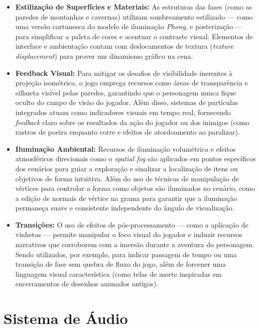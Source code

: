 \begin{itemize}
	\item \textbf{Estilização de Superfícies e Materiais:} As estruturas das fases
	(como as paredes de montanhas e cavernas) utilizam sombreamento estilizado --- como uma versão
	cartunesca do modelo de iluminação \textit{Phong}, e posterização --- para simplificar a paleta
	de cores e acentuar o contraste visual. Elementos de interface e ambientação contam com deslocamentos
	de textura (\textit{texture displacement}) para prover um dinamismo gráfico na cena.

	\item \textbf{Feedback Visual:} Para mitigar os desafios de visibilidade
	inerentes à projeção isométrica, o jogo emprega recursos como áreas de transparência e
	silhueta visível pelas paredes, garantindo que o personagem nunca fique oculto do campo de visão do jogador.
	Além disso, sistemas de partículas integrados atuam como indicadores visuais em tempo real, fornecendo
	\textit{feedback} claro sobre os resultados da ação do jogador ou dos inimigos (como rastros de poeira
	enquanto corre e efeitos de atordoamento ao paralizar).

	\item \textbf{Iluminação Ambiental:} Recursos de iluminação volumétrica e efeitos
	atmosféricos direcionais como o \textit{spatial fog} são aplicados em pontos específicos dos cenários
	para guiar a exploração e sinalizar a localização de itens ou objetivos de forma intuitiva. Além do uso
	de técnicas de manipulação de vértices para controlar a forma como objetos são iluminados no cenário, como
	a edição de normais de vértice na grama para garantir que a iluminação permaneça suave e consistente
	independente do ângulo de visualização.

	\item \textbf{Transições:} O uso de efeitos de pós-processamento --- como
	a aplicação de vinhetas --- permite manipular o foco visual do jogador e induzir recursos narrativos que
	corroborem com a imersão durante a aventura do personagem. Sendo utilizados, por exemplo, para indicar
	passagem de tempo ou uma transição de fase sem quebra de fluxo do jogo, além de forcener uma linguagem visual
	característica (como telas de morte inspiradas em encerramentos de desenhos animados antigos).
\end{itemize}

\section{Sistema de Áudio}
\label{sec:audio}

